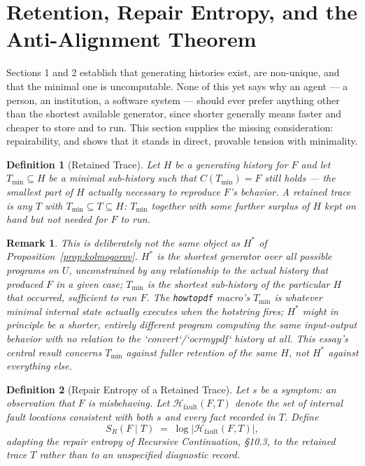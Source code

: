 \documentclass[11pt]{article}
\newtheorem{definition}{Definition}[section]
\newtheorem*{remark}{Remark}
\begin{document}
\section{Retention, Repair Entropy, and the Anti-Alignment Theorem}

Sections 1 and 2 establish that generating histories exist, are non-unique, and that the minimal one is uncomputable. None of this yet says why an agent — a person, an institution, a software system — should ever prefer anything other than the shortest available generator, since shorter generally means faster and cheaper to store and to run. This section supplies the missing consideration: repairability, and shows that it stands in direct, provable tension with minimality.

\begin{definition}[Retained Trace]
Let $H$ be a generating history for $F$ and let $T_{\min}\subseteq H$ be a minimal sub-history such that $C(T_{\min})=F$ still holds — the smallest part of $H$ actually necessary to reproduce $F$'s behavior. A \emph{retained trace} is any $T$ with $T_{\min}\subseteq T\subseteq H$: $T_{\min}$ together with some further surplus of $H$ kept on hand but not needed for $F$ to run.
\end{definition}

\begin{remark}
This is deliberately not the same object as $H^*$ of Proposition~\ref{prop:kolmogorov}. $H^*$ is the shortest generator over \emph{all} possible programs on $U$, unconstrained by any relationship to the actual history that produced $F$ in a given case; $T_{\min}$ is the shortest sub-history of the \emph{particular} $H$ that occurred, sufficient to run $F$. The \texttt{howtopdf} macro's $T_{\min}$ is whatever minimal internal state actually executes when the hotstring fires; $H^*$ might in principle be a shorter, entirely different program computing the same input-output behavior with no relation to the `convert`/`ocrmypdf` history at all. This essay's central result concerns $T_{\min}$ against fuller retention of the same $H$, not $H^*$ against everything else.
\end{remark}

\begin{definition}[Repair Entropy of a Retained Trace]
Let $s$ be a symptom: an observation that $F$ is misbehaving. Let $\mathcal{H}_{\mathrm{fault}}(F,T)$ denote the set of internal fault locations consistent with both $s$ and every fact recorded in $T$. Define
\[
S_R(F\mid T) \;=\; \log\big|\mathcal{H}_{\mathrm{fault}}(F,T)\big|,
\]
adapting the repair entropy of \emph{Recursive Continuation}, \S 10.3, to the retained trace $T$ rather than to an unspecified diagnostic record.
\end{definition}
\end{document}
